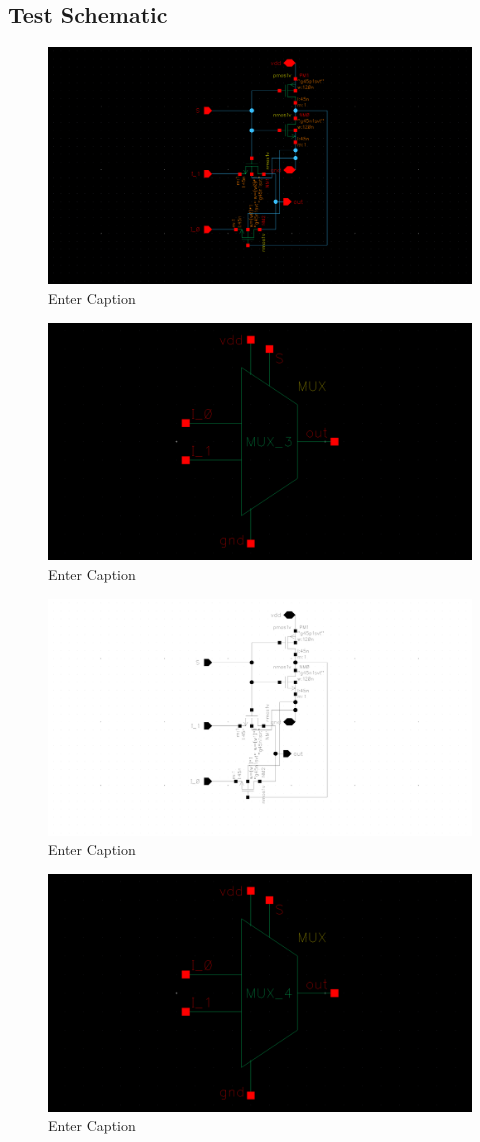 \documentclass[12pt]{article}
\begin{document}
\subsection{Test Schematic}
\begin{figure}[H]
    \centering
    \includegraphics[width=0.5\linewidth]{writeup//figures/updated_muxw0.png}
    \caption{Enter Caption}
\end{figure}
\begin{figure}[H]
    \centering
    \includegraphics[width=0.5\linewidth]{writeup//figures/updated_muxw0sym.png}
    \caption{Enter Caption}
\end{figure}
\begin{figure}[H]
    \centering
    \includegraphics[width=0.5\linewidth]{writeup//figures/updated_muxw1png.png}
    \caption{Enter Caption}
\end{figure}
\begin{figure}[H]
    \centering
    \includegraphics[width=0.5\linewidth]{writeup//figures/updated_muxw1sym.png}
    \caption{Enter Caption}
\end{figure}
\end{document}

